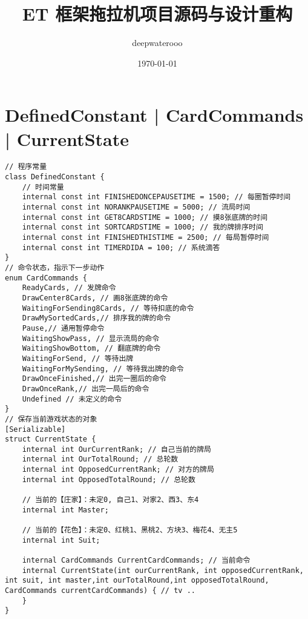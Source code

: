 \documentclass[9pt, b5paper]{article}
\author{deepwaterooo}
\date{\today}
\title{ET 框架拖拉机项目源码与设计重构}
\begin{document}
\maketitle
\tableofcontents


\section{DefinedConstant | CardCommands | CurrentState}
\label{sec-1}
\begin{verbatim}
// 程序常量
class DefinedConstant {
    // 时间常量
    internal const int FINISHEDONCEPAUSETIME = 1500; // 每圈暂停时间
    internal const int NORANKPAUSETIME = 5000; // 流局时间
    internal const int GET8CARDSTIME = 1000; // 摸8张底牌的时间
    internal const int SORTCARDSTIME = 1000; // 我的牌排序时间
    internal const int FINISHEDTHISTIME = 2500; // 每局暂停时间
    internal const int TIMERDIDA = 100; // 系统滴答
}
// 命令状态，指示下一步动作
enum CardCommands {
    ReadyCards, // 发牌命令
    DrawCenter8Cards, // 画8张底牌的命令
    WaitingForSending8Cards, // 等待扣底的命令
    DrawMySortedCards,// 排序我的牌的命令
    Pause,// 通用暂停命令
    WaitingShowPass, // 显示流局的命令
    WaitingShowBottom, // 翻底牌的命令
    WaitingForSend, // 等待出牌
    WaitingForMySending, // 等待我出牌的命令
    DrawOnceFinished,// 出完一圈后的命令
    DrawOnceRank,// 出完一局后的命令
    Undefined // 未定义的命令
}
// 保存当前游戏状态的对象
[Serializable]
struct CurrentState {
    internal int OurCurrentRank; // 自己当前的牌局
    internal int OurTotalRound; // 总轮数
    internal int OpposedCurrentRank; // 对方的牌局
    internal int OpposedTotalRound; // 总轮数

    // 当前的【庄家】：未定0, 自己1、对家2、西3、东4
    internal int Master;

    // 当前的【花色】：未定0、红桃1、黑桃2、方块3、梅花4、无主5
    internal int Suit;

    internal CardCommands CurrentCardCommands; // 当前命令
    internal CurrentState(int ourCurrentRank, int opposedCurrentRank, int suit, int master,int ourTotalRound,int opposedTotalRound, CardCommands currentCardCommands) { // tv ..
    }
}
\end{verbatim}
\end{document}
